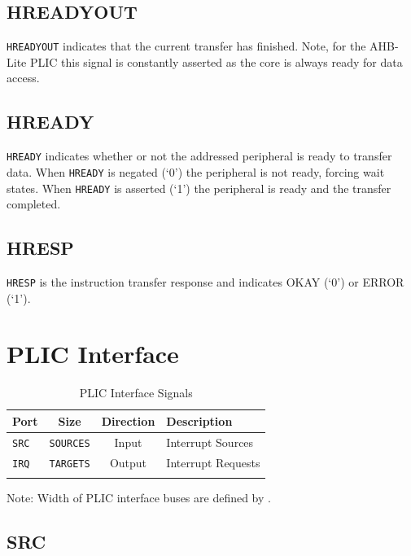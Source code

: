 \subsection{HREADYOUT}

\texttt{HREADYOUT} indicates that the current transfer has finished.
Note, for the AHB-Lite PLIC this signal is constantly asserted as the
core is always ready for data access.

\subsection{HREADY}

\texttt{HREADY} indicates whether or not the addressed peripheral is
ready to transfer data. When \texttt{HREADY} is negated (`0') the
peripheral is not ready, forcing wait states. When \texttt{HREADY} is
asserted (`1') the peripheral is ready and the transfer completed.

\subsection{HRESP}

\texttt{HRESP} is the instruction transfer response and indicates OKAY
(`0') or ERROR (`1').

\pagebreak

\section{PLIC Interface} 


\begin{longtable}[c]{@{\extracolsep{\fill}}lccl@{\extracolsep{\fill}}}	
	\toprule
	\textbf{Port} & \textbf{Size}    & \textbf{Direction} & \textbf{Description}\\
	\midrule 
	\endhead
	\texttt{SRC}  & \texttt{SOURCES} & Input  & Interrupt Sources\\
	\texttt{IRQ}  & \texttt{TARGETS} & Output & Interrupt Requests \\
	\bottomrule 	
	\caption{PLIC Interface Signals} 
	\label{tab:PLICIF2}

\end{longtable}


Note: Width of PLIC interface buses are defined by
. 

\subsection{SRC}


